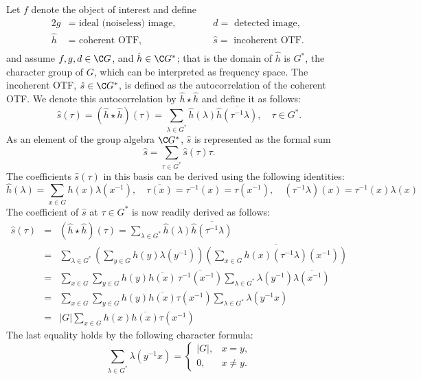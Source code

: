 \newcommand\cPSF{\ensuremath{h}}
\newcommand\cOTF{\ensuremath{\hat{\cPSF}}}
\newcommand\iPSF{\ensuremath{s}}
\newcommand\iOTF{\ensuremath{\hat{\iPSF}}}

Let $f$ denote the object of interest and define
\begin{alignat*}{2}
g &= \text{ ideal (noiseless) image, } \qquad &&d = \text{ detected image, }\\
\cOTF &= \text{ coherent OTF, } \qquad &&\iOTF = \text{ incoherent OTF. }\\
\end{alignat*}
and assume $f, g, d \in \C G$, and $\cOTF \in \C G^*$; that
is the domain of $\cOTF$ is $G^*$, the character group of
$G$, which can be interpreted as frequency space. 
The incoherent OTF, %
$\iOTF \in \C G^*$, is defined as the autocorrelation of the
coherent OTF.  We denote this autocorrelation by $\cOTF
\star \cOTF$ and define it as follows:
\[
\iOTF(\tau) = (\cOTF \star \cOTF)(\tau)
    = \sum_{\lambda \in G^*}\cOTF(\lambda)\overline{\cOTF(\tau^{-1}\lambda)}, \quad \tau \in G^*.
\]
As an element of the group algebra $\C G^*$, $\iOTF$ is represented as
the formal sum
\[
\iOTF = \sum_{\tau \in G^*} \iOTF(\tau)\tau.
\]
The coefficients $\iOTF(\tau)$ in this basis can be derived
using the following identities:
\[
\cOTF(\lambda) = \sum_{x \in G} \cPSF(x)\lambda(x^{-1}),
\quad \overline{\tau(x)} = \tau^{-1}(x) = \tau(x^{-1}), \quad
(\tau^{-1}\lambda)(x) = \tau^{-1}(x) \lambda(x)
\] 
The coefficient of $\iOTF$ at $\tau \in G^*$ is now readily derived as follows:
\begin{eqnarray*}
\iOTF(\tau) &=& (\cOTF \star \cOTF)(\tau) 
    = \sum_{\lambda\in G^*}\cOTF(\lambda)\overline{\cOTF(\tau^{-1}\lambda)}\\
    &=& \sum_{\lambda\in G^*}
     \left(\sum_{y \in G}\cPSF(y)\lambda(y^{-1})\right)
    \overline{\left(\sum_{x \in G}\cPSF(x)(\tau^{-1}\lambda)(x^{-1})\right)}\\
    &=&\sum_{x \in G}\sum_{y \in G}
    \cPSF(y)\overline{\cPSF(x)}\, \overline{\tau^{-1}(x^{-1})}
    \sum_{\lambda\in G^*}\lambda(y^{-1})\overline{\lambda(x^{-1})}\\
    &=&\sum_{x \in G}\sum_{y \in G}
    \cPSF(y)\overline{\cPSF(x)}\tau(x^{-1})
    \sum_{\lambda\in G^*}\lambda(y^{-1}x)\\
    &=&|G|\sum_{x \in G}
    \cPSF(x)\overline{\cPSF(x)}\tau(x^{-1})
\end{eqnarray*}
The last equality holds by the following character formula:
\[
\sum_{\lambda\in G^*}\lambda(y^{-1}x)
= \begin{cases}
|G|, & x=y,\\
0, & x\neq y.
\end{cases}
\]

